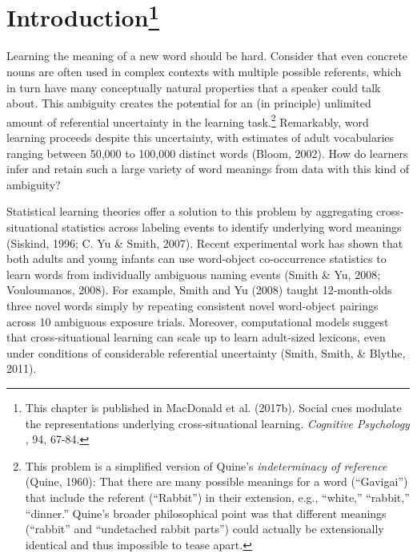 \documentclass[oneside]{report}
\begin{document}
\hypertarget{introduction-3}{%
\section[Introduction]{\texorpdfstring{Introduction\footnote{This
  chapter is published in MacDonald et al. (2017b). Social cues modulate
  the representations underlying cross-situational learning.
  \emph{Cognitive Psychology }, 94, 67-84.}}{Introduction}}\label{introduction-3}}

Learning the meaning of a new word should be hard. Consider that even
concrete nouns are often used in complex contexts with multiple possible
referents, which in turn have many conceptually natural properties that
a speaker could talk about. This ambiguity creates the potential for an
(in principle) unlimited amount of referential uncertainty in the
learning task.\footnote{This problem is a simplified version of Quine's
  \textit{indeterminacy of reference} (Quine, 1960): That there are many
  possible meanings for a word (``Gavigai'') that include the referent
  (``Rabbit'') in their extension, e.g., ``white,'' ``rabbit,''
  ``dinner.'' Quine's broader philosophical point was that different
  meanings (``rabbit'' and ``undetached rabbit parts'') could actually
  be extensionally identical and thus impossible to tease apart.}
Remarkably, word learning proceeds despite this uncertainty, with
estimates of adult vocabularies ranging between 50,000 to 100,000
distinct words (Bloom, 2002). How do learners infer and retain such a
large variety of word meanings from data with this kind of ambiguity?

Statistical learning theories offer a solution to this problem by
aggregating cross-situational statistics across labeling events to
identify underlying word meanings (Siskind, 1996; C. Yu \& Smith, 2007).
Recent experimental work has shown that both adults and young infants
can use word-object co-occurrence statistics to learn words from
individually ambiguous naming events (Smith \& Yu, 2008; Vouloumanos,
2008). For example, Smith and Yu (2008) taught 12-month-olds three novel
words simply by repeating consistent novel word-object pairings across
10 ambiguous exposure trials. Moreover, computational models suggest
that cross-situational learning can scale up to learn adult-sized
lexicons, even under conditions of considerable referential uncertainty
(Smith, Smith, \& Blythe, 2011).
\end{document}
